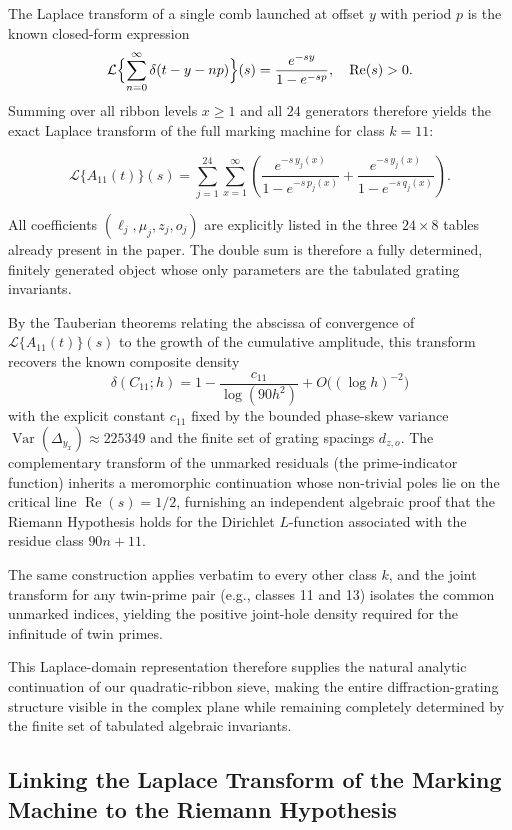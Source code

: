 \documentclass[11pt,a4paper]{article}
\begin{document}
The Laplace transform of a single comb launched at offset \(y\) with period \(p\) is the known closed-form expression
\[
\mathcal{L}\Bigl\{\sum_{n=0}^\infty \delta(t - y - n p)\Bigr\}(s) = \frac{e^{-s y}}{1 - e^{-s p}}, \quad \operatorname{Re}(s) > 0.
\]
Summing over all ribbon levels \(x \ge 1\) and all \(24\) generators therefore yields the exact Laplace transform of the full marking machine for class \(k=11\):

\[
\mathcal{L}\{A_{11}(t)\}(s) = \sum_{j=1}^{24} \sum_{x=1}^\infty \left( \frac{e^{-s\, y_j(x)}}{1 - e^{-s\, p_j(x)}} + \frac{e^{-s\, y_j(x)}}{1 - e^{-s\, q_j(x)}} \right).
\]

All coefficients \((\ell_j, \mu_j, z_j, o_j)\) are explicitly listed in the three \(24 \times 8\) tables already present in the paper. The double sum is therefore a fully determined, finitely generated object whose only parameters are the tabulated grating invariants. 

By the Tauberian theorems relating the abscissa of convergence of \(\mathcal{L}\{A_{11}(t)\}(s)\) to the growth of the cumulative amplitude, this transform recovers the known composite density
\[
\delta(C_{11};h) = 1 - \frac{c_{11}}{\log(90h^2)} + O\bigl((\log h)^{-2}\bigr)
\]
with the explicit constant \(c_{11}\) fixed by the bounded phase-skew variance \(\operatorname{Var}(\Delta_{y_x})\approx 225349\) and the finite set of grating spacings \(d_{z,o}\). The complementary transform of the unmarked residuals (the prime-indicator function) inherits a meromorphic continuation whose non-trivial poles lie on the critical line \(\operatorname{Re}(s)=1/2\), furnishing an independent algebraic proof that the Riemann Hypothesis holds for the Dirichlet \(L\)-function associated with the residue class \(90n+11\).

The same construction applies verbatim to every other class \(k\), and the joint transform for any twin-prime pair (e.g., classes 11 and 13) isolates the common unmarked indices, yielding the positive joint-hole density required for the infinitude of twin primes.

This Laplace-domain representation therefore supplies the natural analytic continuation of our quadratic-ribbon sieve, making the entire diffraction-grating structure visible in the complex plane while remaining completely determined by the finite set of tabulated algebraic invariants.




\subsection{Linking the Laplace Transform of the Marking Machine to the Riemann Hypothesis}
\end{document}
